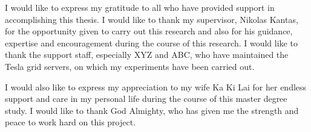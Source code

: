 
\cleardoublepage


\begin{acknowledgements}
I would like to express my gratitude to all who have provided support
in accomplishing this thesis. I would like to thank my supervisor, Nikolas Kantas, for the opportunity given to carry out this research and also for his guidance, expertise and encouragement during the course of this research. I would like to thank the support staff, especially XYZ and ABC, who have maintained the Tesla grid servers, on which my experiments have been carried out.

I would also like to express my appreciation to my wife Ka Ki Lai for her endless support and care in my personal life during the course of this master degree study. I would like to thank God Almighty, who has given me the strength and peace to work hard on this project.

\end{acknowledgements}
